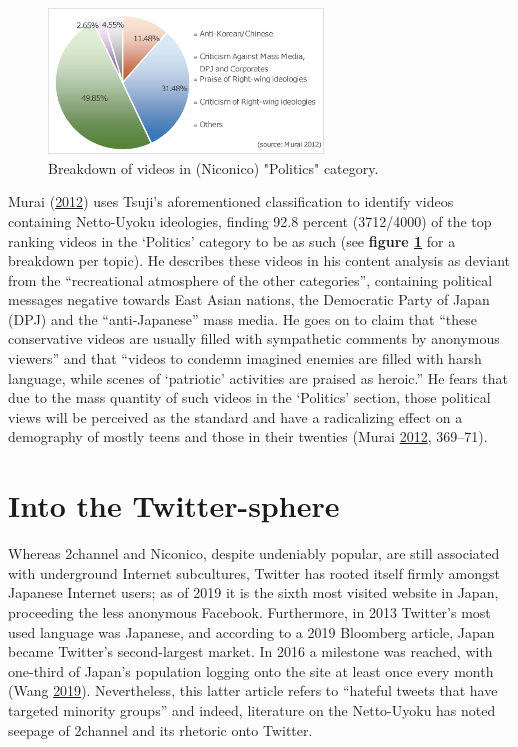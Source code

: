 \documentclass[10pt,british,A4paper,twoside]{memoir}
\begin{document}
\begin{figure}[!htb]
 \centering
 \caption{\label{fig:murai-ratio} Breakdown of videos in (Niconico) "Politics" category.}
 \includegraphics[width=0.65\textwidth,trim=4 4 4 4,clip]{images/murai-ratio2.eps}
\end{figure}

Murai (\protect\hyperlink{ref-murai_net_2012}{2012}) uses Tsuji's
aforementioned classification to identify videos containing Netto-Uyoku
ideologies, finding 92.8 percent (3712/4000) of the top ranking videos
in the `Politics' category to be as such (see \textbf{figure
\ref{fig:murai-ratio}} for a breakdown per topic). He describes these
videos in his content analysis as deviant from the ``recreational
atmosphere of the other categories'', containing political messages
negative towards East Asian nations, the Democratic Party of Japan (DPJ)
and the ``anti-Japanese'' mass media. He goes on to claim that ``these
conservative videos are usually filled with sympathetic comments by
anonymous viewers'' and that ``videos to condemn imagined enemies are
filled with harsh language, while scenes of `patriotic' activities are
praised as heroic.'' He fears that due to the mass quantity of such
videos in the `Politics' section, those political views will be
perceived as the standard and have a radicalizing effect on a demography
of mostly teens and those in their twenties (Murai
\protect\hyperlink{ref-murai_net_2012}{2012}, 369--71).

\section{Into the Twitter-sphere}\label{into-the-twitter-sphere}

Whereas 2channel and Niconico, despite undeniably popular, are still
associated with underground Internet subcultures, Twitter has rooted
itself firmly amongst Japanese Internet users; as of 2019 it is the
sixth most visited website in Japan, proceeding the less anonymous
Facebook. Furthermore, in 2013 Twitter's most used language was
Japanese, and according to a 2019 Bloomberg article, Japan became
Twitter's second-largest market. In 2016 a milestone was reached, with
one-third of Japan's population logging onto the site at least once
every month (Wang \protect\hyperlink{ref-wang_how_2019}{2019}).
Nevertheless, this latter article refers to ``hateful tweets that have
targeted minority groups'' and indeed, literature on the Netto-Uyoku has
noted seepage of 2channel and its rhetoric onto Twitter.
\end{document}
